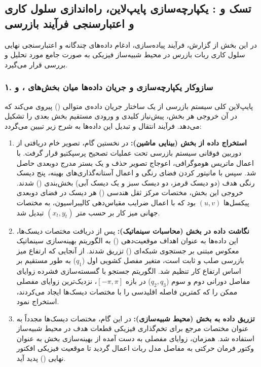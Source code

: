 \documentclass{article}
\begin{document}
\subsection{تسک  و : یکپارچه‌سازی پایپ‌لاین، راه‌اندازی سلول کاری و اعتبارسنجی فرآیند بازرسی}

در این بخش از گزارش، فرآیند پیاده‌سازی، ادغام داده‌های چندگانه و اعتبارسنجی نهایی سلول کاری ربات بازرس  در محیط شبیه‌ساز فیزیکی  به صورت جامع مورد تحلیل و بررسی قرار می‌گیرد. 

\subsubsection*{۱. سازوکار یکپارچه‌سازی و جریان داده‌ها میان بخش‌های ،  و }

پایپ‌لاین کلی سیستم بازرسی از یک ساختار جریان داده‌ی متوالی () پیروی می‌کند که در آن خروجی هر بخش، پیش‌نیاز کلیدی و ورودی مستقیم بخش بعدی را تشکیل می‌دهد. فرآیند انتقال و تبدیل این داده‌ها به شرح زیر تبیین می‌گردد:

\begin{enumerate}
	\item \textbf{استخراج داده از بخش  (بینایی ماشین):} در نخستین گام، تصویر خام دریافتی از دوربین فوقانی سیستم بازرسی تحت عملیات تصحیح پرسپکتیو قرار گرفت. با اعمال ماتریس هوموگرافی، اعوجاج تصویر حذف و یک بستر مدرج دوبعدی حاصل شد. سپس با مانیتور کردن فضای رنگی  و اعمال آستانه‌گذاری‌های بهینه، پنج دیسک رنگی هدف (دو دیسک قرمز، دو دیسک سبز و یک دیسک آبی) بخش‌بندی () شدند. خروجی این بخش، مختصات مرکز ثقل هندسی  () هر دیسک در فضای دوبعدی پیکسل‌ها $(u, v)$ بود که با اعمال ضرایب مقیاس‌دهی کالیبراسیون، به مختصات جهانی میز کار بر حسب متر $(x_t, y_t)$ تبدیل شد.
	
	\item \textbf{نگاشت داده در بخش  (محاسبات سینماتیک):} پس از دریافت مختصات  دیسک‌ها، این داده‌ها به عنوان اهداف موقعیت‌دهی () به الگوریتم بهینه‌سازی سینماتیک معکوس مبتنی بر جستجوی شبکه‌ای () تزریق شدند. از آنجایی که ارتفاع میز بازرسی صلب و ثابت است، متغیر مفصل کشویی اول ($q_1$) به طور مستقیم بر اساس ارتفاع کار تنظیم شد. الگوریتم جستجو با گسسته‌سازی فشرده زوایای مفاصل دورانی دوم و سوم ($q_2, q_3$) در بازه $[-\pi, \pi]$، نزدیک‌ترین زوایای مفصلی ممکن را که کمترین فاصله اقلیدسی را با مختصات دیسک‌ها ایجاد می‌کردند، استخراج نمود.
	
	\item \textbf{تزریق داده به بخش  (محیط شبیه‌سازی):} در این گام، مختصات دیسک‌ها مجدداً به عنوان مختصات مرجع برای تخم‌گذاری فیزیکی قطعات هدف در محیط شبیه‌ساز استفاده شد. همزمان، زوایای مفصلی به دست آمده از بهینه‌سازی بخش  به عنوان وکتور فرمان حرکتی به مفاصل مدل  ربات اعمال گردید تا موقعیت فیزیکی افکتور نهایی ()  پدید آید.
\end{enumerate}
\end{document}
